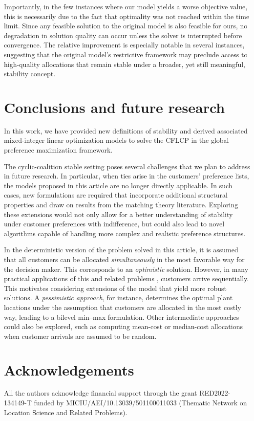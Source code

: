 \documentclass[preprint,11pt,authoryear]{elsarticle}
\begin{document}
Importantly, in the few instances where our model yields a worse objective value, this is necessarily due to the fact that optimality was not reached within the time limit. Since any feasible solution to the original model is also feasible for ours, no degradation in solution quality can occur unless the solver is interrupted before convergence. The relative improvement is especially notable in several instances, suggesting that the original model's restrictive framework may preclude access to high-quality allocations that remain stable under a broader, yet still meaningful, stability concept.



\section{Conclusions and future research} \label{sec:conclusion}
In this work, we have provided new definitions of stability and derived associated mixed-integer linear optimization models to solve the CFLCP in the global preference maximization framework. 

The cyclic-coalition stable setting poses several challenges that we plan to address in future research. In particular, when ties arise in the customers’ preference lists, the models proposed in this article are no longer directly applicable. In such cases, new formulations are required that incorporate additional structural properties and draw on results from the matching theory literature. Exploring these extensions would not only allow for a better understanding of stability under customer preferences with indifference, but could also lead to novel algorithms capable of handling more complex and realistic preference structures.

In the deterministic version of the problem solved in this article, it is assumed that all customers can be allocated \emph{simultaneously} in the most favorable way for the decision maker. This corresponds to an \emph{optimistic} solution. However, in many practical applications of this and related problems \citep[see, e.g.,][]{hassin2024}, customers arrive sequentially. This motivates considering extensions of the model that yield more robust solutions. A \emph{pessimistic approach}, for instance, determines the optimal plant locations under the assumption that customers are allocated in the most costly way, leading to a bilevel min–max formulation. Other intermediate approaches could also be explored, such as computing mean-cost or median-cost allocations when customer arrivals are assumed to be random.


\section*{Acknowledgements} 

All the authors acknowledge financial support through the grant RED2022-134149-T funded by MICIU/AEI/10.13039/501100011033
(Thematic Network on Location Science and Related Problems).



%
 
% 



 
\end{document}
